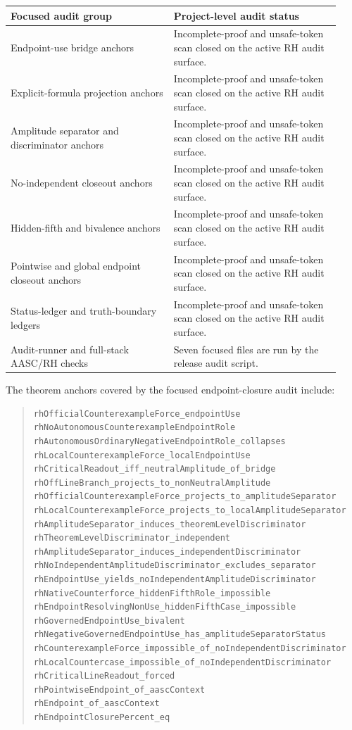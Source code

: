 \documentclass[11pt]{article}
\begin{document}
\begin{longtable}{@{}L{0.46\linewidth}L{0.47\linewidth}@{}}
\toprule
Focused audit group & Project-level audit status \\
\midrule
Endpoint-use bridge anchors & Incomplete-proof and unsafe-token scan closed on the active RH audit surface. \\
Explicit-formula projection anchors & Incomplete-proof and unsafe-token scan closed on the active RH audit surface. \\
Amplitude separator and discriminator anchors & Incomplete-proof and unsafe-token scan closed on the active RH audit surface. \\
No-independent closeout anchors & Incomplete-proof and unsafe-token scan closed on the active RH audit surface. \\
Hidden-fifth and bivalence anchors & Incomplete-proof and unsafe-token scan closed on the active RH audit surface. \\
Pointwise and global endpoint closeout anchors & Incomplete-proof and unsafe-token scan closed on the active RH audit surface. \\
Status-ledger and truth-boundary ledgers & Incomplete-proof and unsafe-token scan closed on the active RH audit surface. \\
Audit-runner and full-stack AASC/RH checks & Seven focused files are run by the release audit script. \\
\bottomrule
\end{longtable}

The theorem anchors covered by the focused endpoint-closure audit include:
\begin{quote}\footnotesize\begin{verbatim}
rhOfficialCounterexampleForce_endpointUse
rhNoAutonomousCounterexampleEndpointRole
rhAutonomousOrdinaryNegativeEndpointRole_collapses
rhLocalCounterexampleForce_localEndpointUse
rhCriticalReadout_iff_neutralAmplitude_of_bridge
rhOffLineBranch_projects_to_nonNeutralAmplitude
rhOfficialCounterexampleForce_projects_to_amplitudeSeparator
rhLocalCounterexampleForce_projects_to_localAmplitudeSeparator
rhAmplitudeSeparator_induces_theoremLevelDiscriminator
rhTheoremLevelDiscriminator_independent
rhAmplitudeSeparator_induces_independentDiscriminator
rhNoIndependentAmplitudeDiscriminator_excludes_separator
rhEndpointUse_yields_noIndependentAmplitudeDiscriminator
rhNativeCounterforce_hiddenFifthRole_impossible
rhEndpointResolvingNonUse_hiddenFifthCase_impossible
rhGovernedEndpointUse_bivalent
rhNegativeGovernedEndpointUse_has_amplitudeSeparatorStatus
rhCounterexampleForce_impossible_of_noIndependentDiscriminator
rhLocalCountercase_impossible_of_noIndependentDiscriminator
rhCriticalLineReadout_forced
rhPointwiseEndpoint_of_aascContext
rhEndpoint_of_aascContext
rhEndpointClosurePercent_eq
\end{verbatim}\end{quote}
\end{document}
